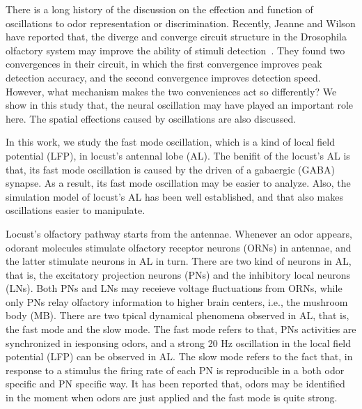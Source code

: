 \documentclass[12pt, a4paper]{article}
\begin{document}
There is a long history of the discussion on the effection and function of oscillations to odor representation or discrimination. Recently, Jeanne and Wilson have reported that, the diverge and converge circuit structure in the Drosophila olfactory system may improve the ability of stimuli detection~\citep{}.  They found two convergences in their circuit, in which the first convergence improves peak detection accuracy, and the second convergence improves detection speed. However, what mechanism makes the two conveniences act so differently? We show in this study that, the neural oscillation may have played an important role here. The spatial effections caused by oscillations are also discussed.

In this work, we study the fast mode oscillation, which is a kind of local field potential (LFP), in locust's antennal lobe (AL). The benifit of the locust's AL is that, its fast mode oscillation is caused by the driven of a gabaergic (GABA) synapse. As a result, its fast mode oscillation may be easier to analyze. Also, the simulation model of locust's AL has been well established, and that also makes oscillations easier to manipulate.

Locust's olfactory pathway starts from the antennae. Whenever an odor appears, odorant molecules stimulate olfactory receptor neurons (ORNs) in antennae, and the latter stimulate neurons in AL in turn. There are two kind of neurons in AL, that is, the excitatory projection neurons (PNs) and the inhibitory local neurons (LNs). Both PNs and LNs may receieve voltage fluctuations from ORNs, while only PNs relay olfactory information to higher brain centers, i.e., the mushroom body (MB). %
There are two tpical dynamical phenomena observed in AL, that is, the fast mode and the slow mode. The fast mode refers to that, PNs activities are synchronized in iesponsing odors, and a strong 20 Hz oscillation in the local field potential (LFP) can be observed in AL. The slow mode refers to the fact that, in response to a stimulus the firing rate of each PN is reproducible in a both odor specific and PN specific way. It has been reported that, odors may be identified in the moment when odors are just applied and the fast mode is quite strong.

\end{document}
